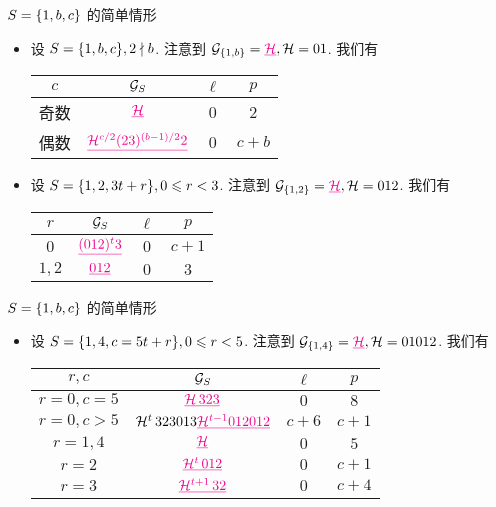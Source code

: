 \documentclass[aspectratio=169,handout]{ctexbeamer}
\renewcommand\ul[1]{{\color{magenta}\underline{#1}}}
\begin{document}
\begin{frame}{$S={\left\{1,b,c\right\}}$ 的简单情形}
	\begin{itemize}
		\item 设 $S={\left\{1,b,c\right\}},2\nmid b$.
		注意到 $\CG_\set{1,b}=\ul\CH, \CH=01$.
		我们有
		\begin{center}
			\begin{tabular}{cccc}
				\toprule
				$c$ & ${\mathcal{G}}_S$ & $\ell$ & $p$\\
				\midrule
				奇数&$\ul\CH$ & $0$ & $2$\\
				偶数&$\ul{\CH^{c/2}(23)^{(b-1)/2}2}$ & $0$ & $c+b$\\
				\bottomrule
			\end{tabular}
		\end{center}

		\item 设 $S={\left\{1,2,3t+r\right\}},0\leqslant r<3$.
		注意到 $\CG_\set{1,2}=\ul\CH, \CH=012$.
		我们有
		\begin{center}
			\begin{tabular}{cccc}
				\toprule
				$r$ & ${\mathcal{G}}_S$ & $\ell$ & $p$\\
				\midrule
				$0$ & $\ul{(012)^t3}$ & $0$ & $c+1$\\
				$1,2$ & $\ul{012}$ & $0$ & $3$\\
				\bottomrule
			\end{tabular}
		\end{center}
	\end{itemize}
\end{frame}


\begin{frame}{$S={\left\{1,b,c\right\}}$ 的简单情形}
	\begin{itemize}
		\item 设 $S={\left\{1,4,c=5t+r\right\}}, 0\leqslant r<5$.
		注意到 $\CG_\set{1,4}=\ul{\CH}, \CH=01012$.
		我们有
		\begin{center}
			\begin{tabular}{cccc}
				\toprule
				$r,c$ & ${\mathcal{G}}_S$ & $\ell$ & $p$\\
				\midrule
				$r=0, c=5$ & $\ul{\CH\,323}$ & $0$ & $8$\\
				$r=0, c>5$ & $\CH^t\,323013\ul{\CH^{t-1}012012}$ & $c+6$ & $c+1$\\
				$r=1,4$ & $\ul\CH$ & $0$ & $5$\\
				$r=2$ & $\ul{\CH^t\,012}$ & $0$ & $c+1$\\
				$r=3$ & $\ul{\CH^{t+1}\,32}$ & $0$ & $c+4$\\
				\bottomrule
			\end{tabular}
		\end{center}
	\end{itemize}
\end{frame}
\end{document}
